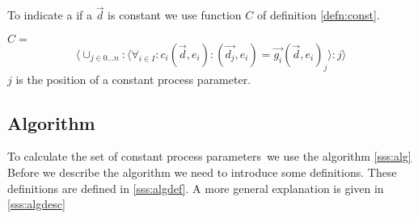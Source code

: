 \documentclass[a4paper,10pt]{article}
\newcommand{\ovr}{\overrightarrow}
\newcommand{\pp}{process parameter}
\newcommand{\pps}{process parameters}
\begin{document}
 To indicate a if a $\ovr{d}$ is constant we use function $C$ of definition \ref{defn:const}.
\begin{defn}
\label{defn:const}$C =$
\begin{displaymath}
 \langle \cup_{j \in 0 \ldots n}: \langle \forall_{i \in I}:
c_i(\ovr{d},e_i) : (\ovr{d_j},e_i) = \ovr{g_i} (\ovr{d},e_i)_j \rangle :
j \rangle 
\end{displaymath}
$j$ is the position of a constant \pp .
\end{defn}

\subsection{Algorithm}
To calculate the set of constant \pps\ we use the algorithm
\ref{sss:alg} Before we describe the algorithm we need to introduce
some definitions. These definitions are defined in \ref{sss:algdef}.
A more general explanation is given in \ref{sss:algdesc}
\end{document}
